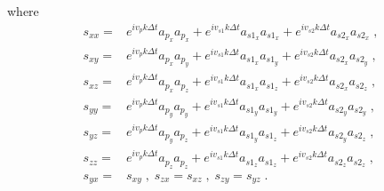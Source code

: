 where
\begin{align}
    \label{eq:exps}
s_{xx} =& e^{i v_p k \Delta t} a_{p_x} a_{p_x} + e^{i v_{s1} k \Delta t} a_{s1_x} a_{s1_x} + e^{i v_{s2} k \Delta t} a_{s2_x} a_{s2_x} \;, \\ \nonumber
s_{xy} =& e^{i v_p k \Delta t} a_{p_x} a_{p_y} + e^{i v_{s1} k \Delta t} a_{s1_x} a_{s1_y} + e^{i v_{s2} k \Delta t} a_{s2_x} a_{s2_y} \;, \\ \nonumber
s_{xz} =& e^{i v_p k \Delta t} a_{p_x} a_{p_z} + e^{i v_{s1} k \Delta t} a_{s1_x} a_{s1_z} + e^{i v_{s2} k \Delta t} a_{s2_x} a_{s2_z} \;, \\ \nonumber
s_{yy} =& e^{i v_p k \Delta t} a_{p_y} a_{p_y} + e^{i v_{s1} k \Delta t} a_{s1_y} a_{s1_y} + e^{i v_{s2} k \Delta t} a_{s2_y} a_{s2_y} \;, \\ \nonumber
s_{yz} =& e^{i v_p k \Delta t} a_{p_y} a_{p_z} + e^{i v_{s1} k \Delta t} a_{s1_y} a_{s1_z} + e^{i v_{s2} k \Delta t} a_{s2_y} a_{s2_z} \;, \\ \nonumber
s_{zz} =& e^{i v_p k \Delta t} a_{p_z} a_{p_z} + e^{i v_{s1} k \Delta t} a_{s1_z} a_{s1_z} + e^{i v_{s2} k \Delta t} a_{s2_z} a_{s2_z} \;, \\ \nonumber
s_{yx} =& s_{xy} \;,\; s_{zx} = s_{xz} \;,\; s_{zy} = s_{yz} \;.
\end{align}

